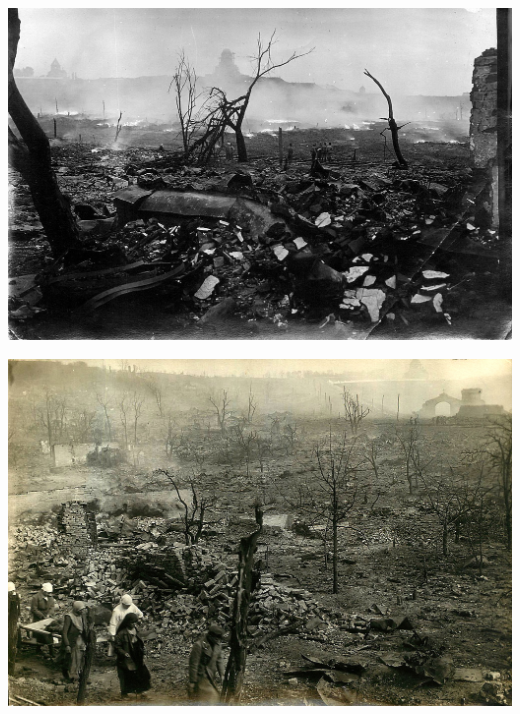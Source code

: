 \vspace*{\fill}

\newpage

\vspace*{\fill}

\begin{center}
\includegraphics[width=\textwidth]{chast-vosp/zver/1350612.jpg}
\end{center}

\begin{center}
\includegraphics[width=\textwidth]{chast-vosp/zver/1350615.jpg}
\end{center}

\vspace*{\fill}

\newpage

